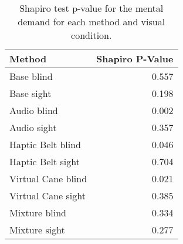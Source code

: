 
\begin{table}[!htb]
\centering
\caption{Shapiro test p-value for the mental demand for each method and visual condition.}
\label{tab:shapiro_mental_demand}
\begin{tabular}{lr}
\toprule
            Method &  Shapiro P-Value \\
\midrule
        Base blind &            0.557 \\
        Base sight &            0.198 \\
       Audio blind &            0.002 \\
       Audio sight &            0.357 \\
 Haptic Belt blind &            0.046 \\
 Haptic Belt sight &            0.704 \\
Virtual Cane blind &            0.021 \\
Virtual Cane sight &            0.385 \\
     Mixture blind &            0.334 \\
     Mixture sight &            0.277 \\
\bottomrule
\end{tabular}
\end{table}

